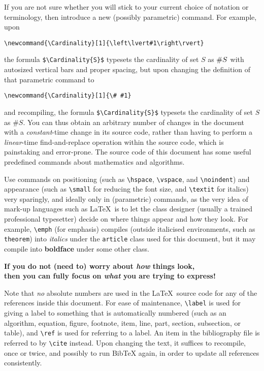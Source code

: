 If you are not sure whether you will stick to your current choice of
notation or terminology, then introduce a new (possibly parametric)
command.  For example, upon
\begin{center}
  \verb|\newcommand{\Cardinality}[1]{\left\lvert#1\right\rvert}|
\end{center}
the formula \verb|$\Cardinality{S}$| typesets the cardinality of set
$S$ as $\Cardinality{S}$ with autosized vertical bars and proper
spacing, but upon changing the definition of that parametric command
to
\begin{center}
  \verb|\newcommand{\Cardinality}[1]{\# #1}|
\end{center}
and recompiling, the formula \verb|$\Cardinality{S}$| typesets the
cardinality of set $S$ as $\#S$.
%
You can thus obtain an arbitrary number of changes in the document
with a \emph{constant}-time change in its source code, rather than
having to perform a \emph{linear}-time find-and-replace operation
within the source code, which is painstaking and error-prone.  The
source code of this document has some useful predefined commands about
mathematics and algorithms.

Use commands on positioning (such as \verb|\hspace|, \verb|\vspace|,
and \verb|\noindent|) and appearance (such as \verb|\small| for
reducing the font size, and \verb|\textit| for italics) very
sparingly, and ideally only in (parametric) commands, as the very idea
of mark-up languages such as \LaTeX\ is to let the class designer
(usually a trained professional typesetter) decide on where things
appear and how they look.  For example, \verb|\emph| (for emphasis)
compiles (outside italicised environments, such as \texttt{theorem})
into \textit{italics} under the \texttt{article} class used for this
document, but it may compile into \textbf{boldface} under some other
class.
\begin{center}
  \textbf{If you do not (need to) worry about \emph{how} things look, \\
    then you can fully focus on \emph{what} you are trying to
    express!}
\end{center}

Note that \emph{no} absolute numbers are used in the \LaTeX\ source
code for any of the references inside this document.  For ease of
maintenance, \verb|\label| is used for giving a label to something
that is automatically numbered (such as an algorithm, equation,
figure, footnote, item, line, part, section, subsection, or table),
and \verb|\ref| is used for referring to a label.  An item in the
bibliography file is referred to by \verb|\cite| instead.  Upon
changing the text, it suffices to recompile, once or twice, and
possibly to run BibTeX again, in order to update all references
consistently.

